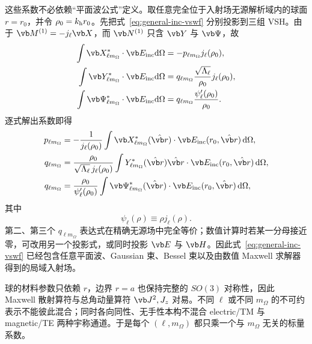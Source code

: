 这些系数不必依赖“平面波公式”定义。取任意完全位于入射场无源解析域内的球面 $r=r_0$，并令
$\rho_0=k_{\rm h}r_0$。先把式~\cref{eq:general-inc-vswf} 分别投影到三组 VSH。由于 $\vb M^{(1)}=-j_\ell\vb X$，而 $\vb N^{(1)}$ 只含 $\vb Y$ 与 $\vb\Psi$，故
\begin{align}
\int\vb X_{\ell m_\Omega}^*\cdot\vb E_{\rm inc}\dd\Omega
&=-p_{\ell m_\Omega}j_\ell(\rho_0),\\
\int\vb Y_{\ell m_\Omega}^*\cdot\vb E_{\rm inc}\dd\Omega
&=q_{\ell m_\Omega}\frac{\sqrt{\Lambda_\ell}}{\rho_0}j_\ell(\rho_0),\\
\int\vb\Psi_{\ell m_\Omega}^*\cdot\vb E_{\rm inc}\dd\Omega
&=q_{\ell m_\Omega}\frac{\psi_\ell'(\rho_0)}{\rho_0}.
\end{align}
逐式解出系数即得
\begin{align}
p_{\ell m_{\Omega}}
&=-\frac{1}{j_\ell(\rho_0)}
\int\vb X_{\ell m_{\Omega}}^*(\hat{\vb r})
\cdot\vb E_{\rm inc}(r_0,\hat{\vb r})\,\dd\Omega,
\label{eq:beam-shape-p-projection}
\\
q_{\ell m_{\Omega}}
&=\frac{\rho_0}
{\sqrt{\Lambda_\ell}\,j_\ell(\rho_0)}
\int Y_{\ell m_{\Omega}}^*(\hat{\vb r})
\hat{\vb r}\cdot\vb E_{\rm inc}(r_0,\hat{\vb r})\,\dd\Omega,
\label{eq:beam-shape-q-radial}
\\
q_{\ell m_{\Omega}}
&=\frac{\rho_0}
{\psi_\ell'(\rho_0)}
\int\vb\Psi_{\ell m_{\Omega}}^*(\hat{\vb r})
\cdot\vb E_{\rm inc}(r_0,\hat{\vb r})\,\dd\Omega,
\label{eq:beam-shape-q-tangential}
\end{align}
其中
\begin{equation}
\psi_\ell(\rho)\equiv\rho j_\ell(\rho).
\end{equation}
第二、第三个 $q_{\ell m_{\Omega}}$ 表达式在精确无源场中完全等价；数值计算时若某一分母接近零，可改用另一个投影式，或同时投影 $\vb E$ 与 $\vb H$。因此式~\cref{eq:general-inc-vswf} 已经包含任意平面波、Gaussian 束、Bessel 束以及由数值 Maxwell 求解器得到的局域入射场。


球的材料参数只依赖 $r$，边界 $r=a$ 也保持完整的 $SO(3)$ 对称性，因此 Maxwell 散射算符与总角动量算符
$\vb J^2,J_z$ 对易。不同 $\ell$ 或不同 $m_{\Omega}$ 的不可约表示不能彼此混合；同时各向同性、无手性本构不混合 electric/TM 与 magnetic/TE 两种宇称通道。于是每个
$(\ell,m_{\Omega})$ 都只乘一个与 $m_{\Omega}$ 无关的标量系数。

